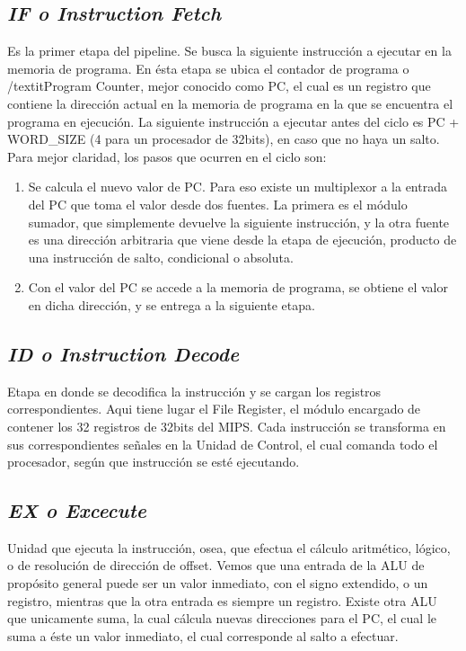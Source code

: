 \documentclass[12pt]{article}
\begin{document}
\subsection{\textit{IF o Instruction Fetch}}
Es la primer etapa del pipeline. Se busca la siguiente instrucción a ejecutar en la memoria de programa. En ésta etapa se ubica el contador de programa o /textit{Program Counter}, mejor conocido como PC, el cual es un registro que contiene la dirección actual en la memoria de programa en la que se encuentra el programa en ejecución. La siguiente instrucción a ejecutar antes del ciclo es PC + WORD\_SIZE (4 para un procesador de 32bits), en caso que no haya un salto. Para mejor claridad, los pasos que ocurren en el ciclo son:

\begin{enumerate}
    \item Se calcula el nuevo valor de PC. Para eso existe un multiplexor a la entrada del PC que toma el valor desde dos fuentes. La primera es el módulo sumador, que simplemente devuelve la siguiente instrucción, y la otra fuente es una dirección arbitraria que viene desde la etapa de ejecución, producto de una instrucción de salto, condicional o absoluta.
    \item Con el valor del PC se accede a la memoria de programa, se obtiene el valor en dicha dirección, y se entrega a la siguiente etapa.
\end{enumerate}

\subsection{\textit{ID o Instruction Decode}}
Etapa en donde se decodifica la instrucción y se cargan los registros correspondientes. Aqui tiene lugar el File Register, el módulo encargado de contener los 32 registros de 32bits del MIPS. Cada instrucción se transforma en sus correspondientes señales en la Unidad de Control, el cual comanda todo el procesador, según que instrucción se esté ejecutando.

\subsection{\textit{EX o Excecute}}
Unidad que ejecuta la instrucción, osea, que efectua el cálculo aritmético, lógico, o de resolución de dirección de offset. Vemos que una entrada de la ALU de propósito general puede ser un valor inmediato, con el signo extendido, o un registro, mientras que la otra entrada es siempre un registro. Existe otra ALU que unicamente suma, la cual cálcula nuevas direcciones para el PC, el cual le suma a éste un valor inmediato, el cual corresponde al salto a efectuar.
\end{document}
